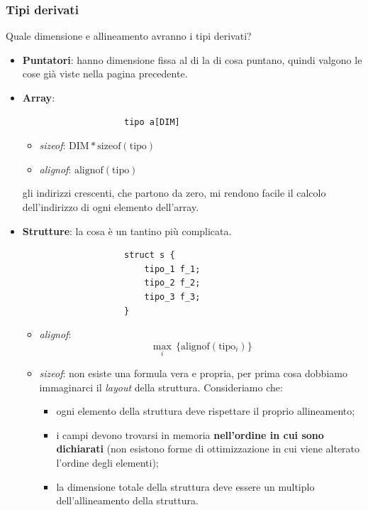 			\subsubsection{Tipi derivati}
			Quale dimensione e allineamento avranno i tipi derivati?
			\begin{itemize}
				\item \textbf{Puntatori}: hanno dimensione fissa al di la di cosa puntano, quindi valgono le cose già viste nella pagina precedente.
				\item  \textbf{Array}: \begin{verbatim}
					tipo a[DIM]
				\end{verbatim}
				\begin{multicols}{2}
					\begin{itemize}
						\item \emph{sizeof}: $\text{DIM} * \text{sizeof}(\text{tipo})$
						\item \emph{alignof}: $\text{alignof}(\text{tipo})$
					\end{itemize}
				\end{multicols}
				gli indirizzi crescenti, che partono da zero, mi rendono facile il calcolo dell'indirizzo di ogni elemento dell'array.
				
				\item \textbf{Strutture}: la cosa è un tantino più complicata.
				
				\begin{verbatim}
					struct s {
						tipo_1 f_1;
						tipo_2 f_2;
						tipo_3 f_3;
					}
				\end{verbatim}
			\begin{itemize}
					\item \emph{alignof}: \[\max_i\, \{ \text{alignof}(\text{tipo$_i$})\}\]
					\item \emph{sizeof}: non esiste una formula vera e propria, per prima cosa dobbiamo immaginarci il \emph{layout} della struttura. Consideriamo che:
					\begin{itemize}
						\item ogni elemento della struttura deve rispettare il proprio allineamento; 
						\item i campi devono trovarsi in memoria \textbf{nell'ordine in cui sono dichiarati} (non esistono forme di ottimizzazione in cui viene alterato l'ordine degli elementi);
						\item la dimensione totale della struttura deve essere un multiplo dell'allineamento della struttura.
					\end{itemize}
				\end{itemize}
			\end{itemize}
